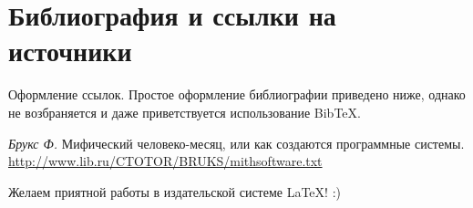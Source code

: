 \section{Библиография и ссылки на источники}

Оформление ссылок\cite{brooks}. Простое оформление библиографии
приведено ниже, однако не возбраняется и даже приветствуется
использование BibTeX.

\begin{thebibliography}{9}
 \textit{Брукс Ф.} Мифический человеко-месяц,
  или как создаются программные системы. \url{http://www.lib.ru/CTOTOR/BRUKS/mithsoftware.txt}
\end{thebibliography}

Желаем приятной работы в издательской системе \LaTeX! :)

